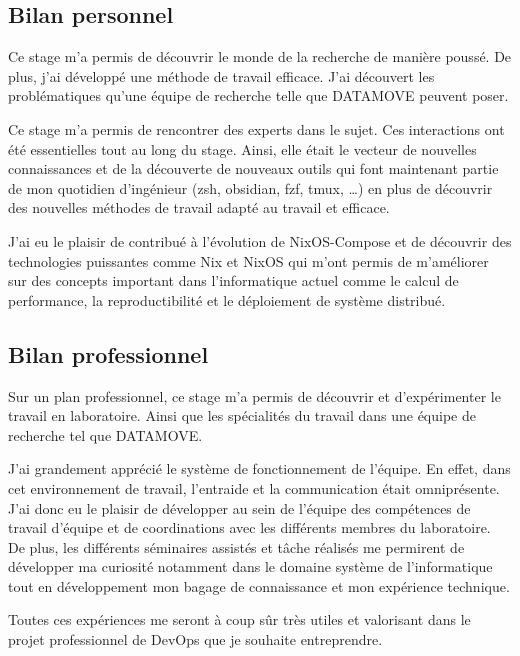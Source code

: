 \documentclass[a4paper,french,12pt, titlepage]{article}
\begin{document}
\hypertarget{bilan-personnel}{%
\subsection{Bilan personnel}\label{bilan-personnel}}

Ce stage m'a permis de découvrir le monde de la recherche de manière
poussé. De plus, j'ai développé une méthode de travail efficace. J'ai
découvert les problématiques qu'une équipe de recherche telle que
DATAMOVE peuvent poser.

Ce stage m'a permis de rencontrer des experts dans le sujet. Ces
interactions ont été essentielles tout au long du stage. Ainsi, elle
était le vecteur de nouvelles connaissances et de la découverte de
nouveaux outils qui font maintenant partie de mon quotidien d'ingénieur
(zsh, obsidian, fzf, tmux, \ldots) en plus de découvrir des nouvelles
méthodes de travail adapté au travail et efficace.

J'ai eu le plaisir de contribué à l'évolution de NixOS-Compose et de
découvrir des technologies puissantes comme Nix et NixOS qui m'ont
permis de m'améliorer sur des concepts important dans l'informatique
actuel comme le calcul de performance, la reproductibilité et le
déploiement de système distribué.\newline

\hypertarget{bilan-professionnel}{%
\subsection{Bilan professionnel}\label{bilan-professionnel}}

Sur un plan professionnel, ce stage m'a permis de découvrir et
d'expérimenter le travail en laboratoire. Ainsi que les spécialités du
travail dans une équipe de recherche tel que DATAMOVE.

J'ai grandement apprécié le système de fonctionnement de l'équipe. En
effet, dans cet environnement de travail, l'entraide et la communication
était omniprésente. J'ai donc eu le plaisir de développer au sein de
l'équipe des compétences de travail d'équipe et de coordinations avec
les différents membres du laboratoire. De plus, les différents
séminaires assistés et tâche réalisés me permirent de développer ma
curiosité notamment dans le domaine système de l'informatique tout en
développement mon bagage de connaissance et mon expérience technique.

Toutes ces expériences me seront à coup sûr très utiles et valorisant
dans le projet professionnel de DevOps que je souhaite entreprendre.
\end{document}
